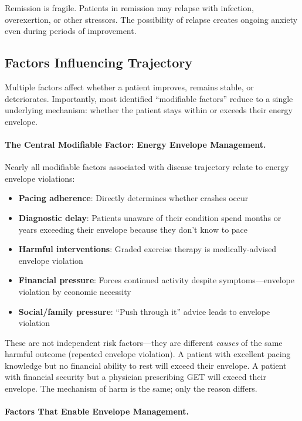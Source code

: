 Remission is fragile. Patients in remission may relapse with infection, overexertion, or other stressors. The possibility of relapse creates ongoing anxiety even during periods of improvement.

\subsection{Factors Influencing Trajectory}

Multiple factors affect whether a patient improves, remains stable, or deteriorates. Importantly, most identified ``modifiable factors'' reduce to a single underlying mechanism: whether the patient stays within or exceeds their energy envelope.

\paragraph{The Central Modifiable Factor: Energy Envelope Management.}

Nearly all modifiable factors associated with disease trajectory relate to energy envelope violations:

\begin{itemize}
    \item \textbf{Pacing adherence}: Directly determines whether crashes occur
    \item \textbf{Diagnostic delay}: Patients unaware of their condition spend months or years exceeding their envelope because they don't know to pace~\cite{Lacourt2022prognosis}
    \item \textbf{Harmful interventions}: Graded exercise therapy is medically-advised envelope violation
    \item \textbf{Financial pressure}: Forces continued activity despite symptoms---envelope violation by economic necessity
    \item \textbf{Social/family pressure}: ``Push through it'' advice leads to envelope violation
\end{itemize}

These are not independent risk factors---they are different \emph{causes} of the same harmful outcome (repeated envelope violation). A patient with excellent pacing knowledge but no financial ability to rest will exceed their envelope. A patient with financial security but a physician prescribing GET will exceed their envelope. The mechanism of harm is the same; only the reason differs.

\paragraph{Factors That Enable Envelope Management.}


